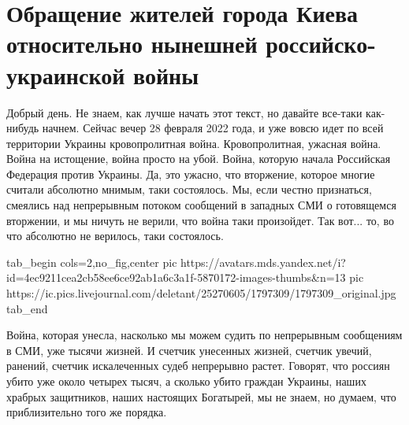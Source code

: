  
 
 
 
 

\section{Обращение жителей города Киева относительно нынешней российско-украинской войны}

Добрый день. Не знаем, как лучше начать этот текст, но давайте все-таки
как-нибудь начнем. Сейчас вечер 28 февраля 2022 года, и уже вовсю идет по всей
территории Украины кровопролитная война. Кровопролитная, ужасная война. Война
на истощение, война просто на убой. Война, которую начала Российская Федерация
против Украины. Да, это ужасно, что вторжение, которое многие считали абсолютно
мнимым, таки состоялось. Мы, если честно признаться, смеялись над непрерывным
потоком сообщений в западных СМИ о готовящемся вторжении, и мы ничуть не
верили, что война таки произойдет. Так вот... то, во что абсолютно не верилось,
таки состоялось.

\ifcmt
  tab_begin cols=2,no_fig,center
     pic https://avatars.mds.yandex.net/i?id=4ec9211cea2cb58ee6ce92ab1a6c3a1f-5870172-images-thumbs&n=13
		 pic https://ic.pics.livejournal.com/deletant/25270605/1797309/1797309_original.jpg
  tab_end
\fi

Война, которая унесла, насколько мы можем судить по непрерывным сообщениям в
СМИ, уже тысячи жизней. И счетчик унесенных жизней, счетчик увечий, ранений,
счетчик искалеченных судеб непрерывно растет.  Говорят, что россиян убито уже
около четырех тысяч, а сколько убито граждан Украины, наших храбрых защитников,
наших настоящих Богатырей, мы не знаем, но думаем, что приблизительно того же
порядка.

